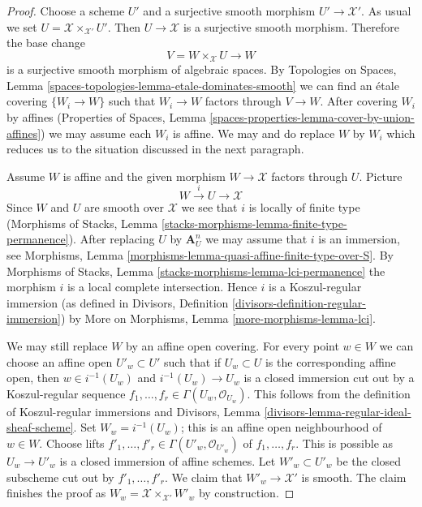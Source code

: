\documentclass{stacks-project}
\theoremstyle{plain}
\theoremstyle{definition}
\theoremstyle{remark}
\numberwithin{equation}{subsection}
\begin{document}
\begin{proof}
Choose a scheme $U'$ and a surjective smooth morphism $U' \to \mathcal{X}'$.
As usual we set $U = \mathcal{X} \times_{\mathcal{X}'} U'$. Then
$U \to \mathcal{X}$ is a surjective smooth morphism. Therefore the base change
$$
V = W \times_{\mathcal{X}} U \longrightarrow W
$$
is a surjective smooth morphism of algebraic spaces.
By Topologies on Spaces, Lemma
\ref{spaces-topologies-lemma-etale-dominates-smooth}
we can find an \'etale covering $\{W_i \to W\}$ such
that $W_i \to W$ factors through $V \to W$.
After covering $W_i$ by affines (Properties of Spaces, Lemma
\ref{spaces-properties-lemma-cover-by-union-affines})
we may assume each $W_i$ is affine. We may and do replace $W$ by $W_i$
which reduces us to the situation discussed in the next paragraph.

\medskip\noindent
Assume $W$ is affine and the given morphism $W \to \mathcal{X}$ factors
through $U$. Picture
$$
W \xrightarrow{i} U \to \mathcal{X}
$$
Since $W$ and $U$ are smooth over $\mathcal{X}$ we see that
$i$ is locally of finite type (Morphisms of Stacks, Lemma
\ref{stacks-morphisms-lemma-finite-type-permanence}).
After replacing $U$ by $\mathbf{A}^n_U$ we may assume
that $i$ is an immersion, see
Morphisms, Lemma \ref{morphisms-lemma-quasi-affine-finite-type-over-S}.
By Morphisms of Stacks,
Lemma \ref{stacks-morphisms-lemma-lci-permanence}
the morphism $i$ is a local complete intersection.
Hence $i$ is a Koszul-regular immersion (as defined in
Divisors, Definition \ref{divisors-definition-regular-immersion})
by More on Morphisms, Lemma \ref{more-morphisms-lemma-lci}.

\medskip\noindent
We may still replace $W$ by an affine open covering.
For every point $w \in W$ we can choose an affine open
$U'_w \subset U'$ such that if $U_w \subset U$ is the
corresponding affine open, then $w \in i^{-1}(U_w)$ and
$i^{-1}(U_w) \to U_w$ is a closed immersion cut out
by a Koszul-regular sequence
$f_1, \ldots, f_r \in \Gamma(U_w, \mathcal{O}_{U_w})$.
This follows from the definition of Koszul-regular immersions
and Divisors, Lemma \ref{divisors-lemma-regular-ideal-sheaf-scheme}.
Set $W_w = i^{-1}(U_w)$; this is an affine open neighbourhood
of $w \in W$.
Choose lifts $f'_1, \ldots, f'_r \in \Gamma(U'_w, \mathcal{O}_{U'_w})$
of $f_1, \ldots, f_r$. This is possible as $U_w \to U'_w$
is a closed immersion of affine schemes.
Let $W'_w \subset U'_w$ be the closed subscheme cut out by
$f'_1, \ldots, f'_r$.
We claim that $W'_w \to \mathcal{X}'$ is smooth.
The claim finishes the proof as
$W_w = \mathcal{X} \times_{\mathcal{X}'} W'_w$
by construction.


\end{proof}
\end{document}
